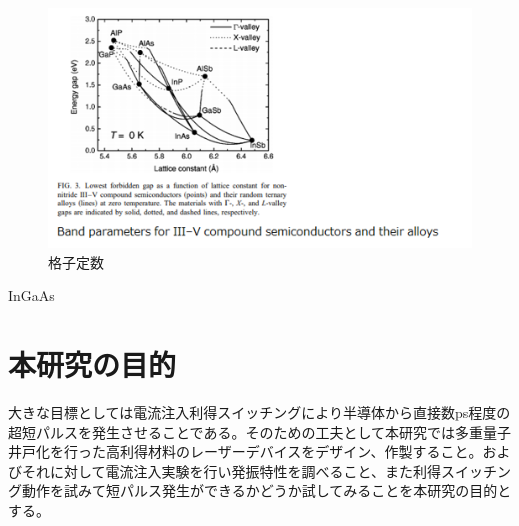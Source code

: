 \begin{figure}[h]
	\centering
	\includegraphics[width=15cm]{figure/fig_1_1_lattice_constance.png}
	\caption{格子定数}
	\label{fig:fig_latice_constancce}
\end{figure}

InGaAs
\clearpage
\section{本研究の目的}

大きな目標としては電流注入利得スイッチングにより半導体から直接数ps程度の超短パルスを発生させることである。そのための工夫として本研究では多重量子井戸化を行った高利得材料のレーザーデバイスをデザイン、作製すること。およびそれに対して電流注入実験を行い発振特性を調べること、また利得スイッチング動作を試みて短パルス発生ができるかどうか試してみることを本研究の目的とする。